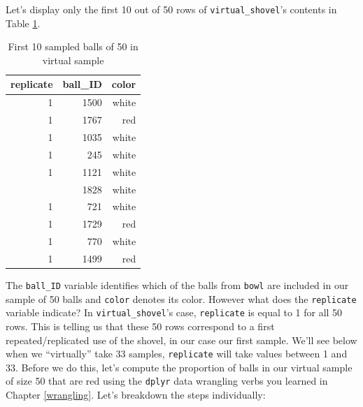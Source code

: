\documentclass[12pt, krantz2,]{krantz}
\makeatletter
\newenvironment{Shaded}{\begin{snugshade}}{\end{snugshade}}
\newcommand{\DataTypeTok}[1]{\textcolor[rgb]{0.27,0.27,0.27}{#1}}
\newcommand{\DecValTok}[1]{\textcolor[rgb]{0.06,0.06,0.06}{#1}}
\newcommand{\KeywordTok}[1]{\textcolor[rgb]{0.27,0.27,0.27}{\textbf{#1}}}
\newcommand{\NormalTok}[1]{#1}
\newcommand{\OperatorTok}[1]{\textcolor[rgb]{0.43,0.43,0.43}{\textbf{#1}}}
\newcommand{\StringTok}[1]{\textcolor[rgb]{0.5,0.5,0.5}{#1}}
\newenvironment{kframe}{%
\medskip{}
\setlength{\fboxsep}{.8em}
 \def\at@end@of@kframe{}%
 \ifinner\ifhmode%
  \def\at@end@of@kframe{\end{minipage}}%
  \begin{minipage}{\columnwidth}%
 \fi\fi%
 \def\FrameCommand##1{\hskip\@totalleftmargin \hskip-\fboxsep
 \colorbox{shadecolor}{##1}\hskip-\fboxsep
     \hskip-\linewidth \hskip-\@totalleftmargin \hskip\columnwidth}%
 \MakeFramed {\advance\hsize-\width
   \@totalleftmargin\z@ \linewidth\hsize
   \@setminipage}}%
 {\par\unskip\endMakeFramed%
 \at@end@of@kframe}
\renewenvironment{Shaded}{\begin{kframe}}{\end{kframe}}
\makeatother
\begin{document}
\begin{Shaded}
\end{Shaded}

Let's display only the first 10 out of 50 rows of \texttt{virtual\_shovel}'s contents in Table \ref{tab:virtual-shovel}.

\begin{table}[H]

\caption{\label{tab:virtual-shovel}First 10 sampled balls of 50 in virtual sample}
\centering
\fontsize{10}{12}\selectfont
\begin{tabular}{rrr}
\toprule
replicate & ball\_ID & color\\
\midrule
1 & 1500 & white\\
1 & 1767 & red\\
1 & 1035 & white\\
1 & 245 & white\\
1 & 1121 & white\\
\addlinespace
1 & 1828 & white\\
1 & 721 & white\\
1 & 1729 & red\\
1 & 770 & white\\
1 & 1499 & red\\
\bottomrule
\end{tabular}
\end{table}

The \texttt{ball\_ID} variable identifies which of the balls from \texttt{bowl} are included in our sample of 50 balls and \texttt{color} denotes its color. However what does the \texttt{replicate} variable indicate? In \texttt{virtual\_shovel}'s case, \texttt{replicate} is equal to 1 for all 50 rows. This is telling us that these 50 rows correspond to a first repeated/replicated use of the shovel, in our case our first sample. We'll see below when we ``virtually'' take 33 samples, \texttt{replicate} will take values between 1 and 33. Before we do this, let's compute the proportion of balls in our virtual sample of size 50 that are red using the \texttt{dplyr} data wrangling verbs you learned in Chapter \ref{wrangling}. Let's breakdown the steps individually:
\end{document}
